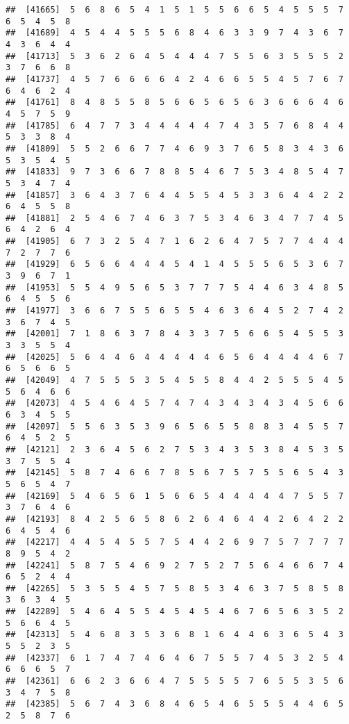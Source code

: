 \documentclass[
]{book}
\begin{document}
\begin{verbatim}
##  [41665]  5  6  8  6  5  4  1  5  1  5  5  6  6  5  4  5  5  5  7  6  5  4  5  8
##  [41689]  4  5  4  4  5  5  5  6  8  4  6  3  3  9  7  4  3  6  7  4  3  6  4  4
##  [41713]  5  3  6  2  6  4  5  4  4  4  7  5  5  6  3  5  5  5  2  3  7  6  6  8
##  [41737]  4  5  7  6  6  6  6  4  2  4  6  6  5  5  4  5  7  6  7  6  4  6  2  4
##  [41761]  8  4  8  5  5  8  5  6  6  5  6  5  6  3  6  6  6  4  6  4  5  7  5  9
##  [41785]  6  4  7  7  3  4  4  4  4  4  7  4  3  5  7  6  8  4  4  5  3  3  8  4
##  [41809]  5  5  2  6  6  7  7  4  6  9  3  7  6  5  8  3  4  3  6  5  3  5  4  5
##  [41833]  9  7  3  6  6  7  8  8  5  4  6  7  5  3  4  8  5  4  7  5  3  4  7  4
##  [41857]  3  6  4  3  7  6  4  4  5  5  4  5  3  3  6  4  4  2  2  6  4  5  5  8
##  [41881]  2  5  4  6  7  4  6  3  7  5  3  4  6  3  4  7  7  4  5  6  4  2  6  4
##  [41905]  6  7  3  2  5  4  7  1  6  2  6  4  7  5  7  7  4  4  4  7  2  7  7  6
##  [41929]  6  5  6  6  4  4  4  5  4  1  4  5  5  5  6  5  3  6  7  3  9  6  7  1
##  [41953]  5  5  4  9  5  6  5  3  7  7  7  5  4  4  6  3  4  8  5  6  4  5  5  6
##  [41977]  3  6  6  7  5  5  6  5  5  4  6  3  6  4  5  2  7  4  2  3  6  7  4  5
##  [42001]  7  1  8  6  3  7  8  4  3  3  7  5  6  6  5  4  5  5  3  3  3  5  5  4
##  [42025]  5  6  4  4  6  4  4  4  4  4  6  5  6  4  4  4  4  6  7  6  5  6  6  5
##  [42049]  4  7  5  5  5  3  5  4  5  5  8  4  4  2  5  5  5  4  5  5  6  4  6  6
##  [42073]  4  5  4  6  4  5  7  4  7  4  3  4  3  4  3  4  5  6  6  6  3  4  5  5
##  [42097]  5  5  6  3  5  3  9  6  5  6  5  5  8  8  3  4  5  5  7  6  4  5  2  5
##  [42121]  2  3  6  4  5  6  2  7  5  3  4  3  5  3  8  4  5  3  5  3  7  5  5  4
##  [42145]  5  8  7  4  6  6  7  8  5  6  7  5  7  5  5  6  5  4  3  5  6  5  4  7
##  [42169]  5  4  6  5  6  1  5  6  6  5  4  4  4  4  4  7  5  5  7  3  7  6  4  6
##  [42193]  8  4  2  5  6  5  8  6  2  6  4  6  4  4  2  6  4  2  2  6  4  5  4  6
##  [42217]  4  4  5  4  5  5  7  5  4  4  2  6  9  7  5  7  7  7  7  8  9  5  4  2
##  [42241]  5  8  7  5  4  6  9  2  7  5  2  7  5  6  4  6  6  7  4  6  5  2  4  4
##  [42265]  5  3  5  5  4  5  7  5  8  5  3  4  6  3  7  5  8  5  8  3  6  3  4  5
##  [42289]  5  4  6  4  5  5  4  5  4  5  4  6  7  6  5  6  3  5  2  5  6  6  4  5
##  [42313]  5  4  6  8  3  5  3  6  8  1  6  4  4  6  3  6  5  4  3  5  5  2  3  5
##  [42337]  6  1  7  4  7  4  6  4  6  7  5  5  7  4  5  3  2  5  4  6  6  6  5  7
##  [42361]  6  6  2  3  6  6  4  7  5  5  5  5  7  6  5  5  3  5  6  3  4  7  5  8
##  [42385]  5  6  7  4  3  6  8  4  6  5  4  6  5  5  5  4  4  6  5  2  5  8  7  6

\end{verbatim}
\end{document}
